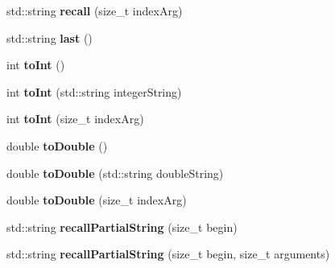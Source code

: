 \begin{DoxyCompactItemize}
\item 
\hypertarget{classStringstack_a1ffee5cf0fac3be196cb6a2da5248c68}{std\-::string {\bfseries recall} (size\-\_\-t index\-Arg)}\label{classStringstack_a1ffee5cf0fac3be196cb6a2da5248c68}

\item 
\hypertarget{classStringstack_a6451d4ae727082e186bc1e823787cfcd}{std\-::string {\bfseries last} ()}\label{classStringstack_a6451d4ae727082e186bc1e823787cfcd}

\item 
\hypertarget{classStringstack_a8e8b15949b4e1a48c0b64f7631a17e5b}{int {\bfseries to\-Int} ()}\label{classStringstack_a8e8b15949b4e1a48c0b64f7631a17e5b}

\item 
\hypertarget{classStringstack_a225f2ec993cdc23513eddc64eec914b8}{int {\bfseries to\-Int} (std\-::string integer\-String)}\label{classStringstack_a225f2ec993cdc23513eddc64eec914b8}

\item 
\hypertarget{classStringstack_a2bf7ea8186405b71cf4c401bd9593708}{int {\bfseries to\-Int} (size\-\_\-t index\-Arg)}\label{classStringstack_a2bf7ea8186405b71cf4c401bd9593708}

\item 
\hypertarget{classStringstack_a3ba9b3e887c482b2dab3fe3f4010fa2d}{double {\bfseries to\-Double} ()}\label{classStringstack_a3ba9b3e887c482b2dab3fe3f4010fa2d}

\item 
\hypertarget{classStringstack_a743b4fca4f2dde9b593cc4d4cb8d3a3d}{double {\bfseries to\-Double} (std\-::string double\-String)}\label{classStringstack_a743b4fca4f2dde9b593cc4d4cb8d3a3d}

\item 
\hypertarget{classStringstack_a3b4ee6ffffd6b0686854e20d4c126c8d}{double {\bfseries to\-Double} (size\-\_\-t index\-Arg)}\label{classStringstack_a3b4ee6ffffd6b0686854e20d4c126c8d}

\item 
\hypertarget{classStringstack_aac6c5200c1210f181f9c84885e85dc75}{std\-::string {\bfseries recall\-Partial\-String} (size\-\_\-t begin)}\label{classStringstack_aac6c5200c1210f181f9c84885e85dc75}

\item 
\hypertarget{classStringstack_abd25b981a984a4bfc23eaff79fa6006e}{std\-::string {\bfseries recall\-Partial\-String} (size\-\_\-t begin, size\-\_\-t arguments)}\label{classStringstack_abd25b981a984a4bfc23eaff79fa6006e}


\end{DoxyCompactItemize}
